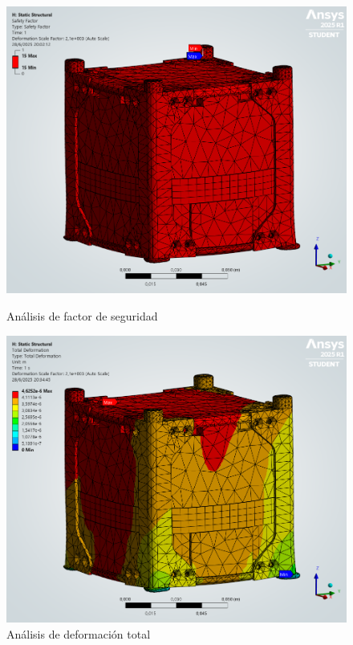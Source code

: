       \begin{figure}[H]
        \begin{minipage}{0.5\textwidth}
          \centering
          \includegraphics[width=\textwidth]{image/fem/ansys_cubesat-static_safety.png}
          \caption{Análisis de factor de seguridad}
          \label{fig:fem_static_safety}
        \end{minipage}
        \begin{minipage}{0.5\textwidth}
          \centering
          \includegraphics[width=\textwidth]{image/fem/ansys_cubesat-static_deformation.png}
          \caption{Análisis de deformación total}
          \label{fig:fem_static_deformation}
        \end{minipage}
      \end{figure}

